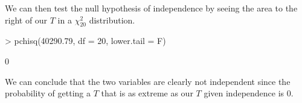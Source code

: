 \documentclass[handout]{beamer}
\begin{document}
\begin{frame}[fragile]
We can then test the null hypothesis of independence by seeing the
area to the right of our $T$ in a $\chi^2_{20}$ distribution.
\tiny
\pause
\medskip
\begin{Schunk}
\begin{Sinput}
> pchisq(40290.79, df = 20, lower.tail = F)
\end{Sinput}
\begin{Soutput}
[1] 0
\end{Soutput}
\end{Schunk}
\normalsize
\pause
\bigskip
We can conclude that the two variables are clearly not independent since
the probability of getting a $T$ that is as extreme as our $T$ given
independence is 0.
\end{frame}
\end{document}
